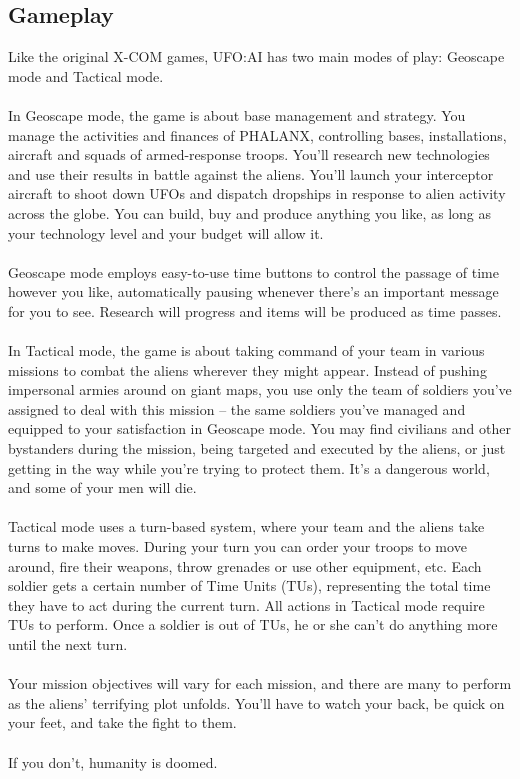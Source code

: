 \subsection{Gameplay}
Like the original X-COM games, UFO:AI has two main modes of play: Geoscape mode and Tactical mode.\\
\\
In Geoscape mode, the game is about base management and strategy. You manage the activities and finances of PHALANX, controlling bases, installations, aircraft and squads of armed-response troops. You'll research new technologies and use their results in battle against the aliens. You'll launch your interceptor aircraft to shoot down UFOs and dispatch dropships in response to alien activity across the globe. You can build, buy and produce anything you like, as long as your technology level and your budget will allow it.\\
\\
Geoscape mode employs easy-to-use time buttons to control the passage of time however you like, automatically pausing whenever there's an important message for you to see. Research will progress and items will be produced as time passes.\\
\\
In Tactical mode, the game is about taking command of your team in various missions to combat the aliens wherever they might appear. Instead of pushing impersonal armies around on giant maps, you use only the team of soldiers you've assigned to deal with this mission -- the same soldiers you've managed and equipped to your satisfaction in Geoscape mode. You may find civilians and other bystanders during the mission, being targeted and executed by the aliens, or just getting in the way while you're trying to protect them. It's a dangerous world, and some of your men will die.\\
\\
Tactical mode uses a turn-based system, where your team and the aliens take turns to make moves. During your turn you can order your troops to move around, fire their weapons, throw grenades or use other equipment, etc. Each soldier gets a certain number of Time Units (TUs), representing the total time they have to act during the current turn. All actions in Tactical mode require TUs to perform. Once a soldier is out of TUs, he or she can't do anything more until the next turn.\\
\\
Your mission objectives will vary for each mission, and there are many to perform as the aliens' terrifying plot unfolds. You'll have to watch your back, be quick on your feet, and take the fight to them.\\
\\
If you don't, humanity is doomed.

